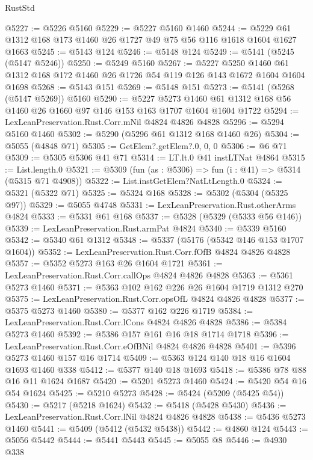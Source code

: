 \begin{lexlean}{RustStd}
\begin{coremodule}
@5227 := @5226 @5160
@5229 := @5227 @5160 @1460
@5244 := @5229 @61 @1312 @168 @173 @1460 @26 @1727 @49 @75 @56 @116 @1618 @1604 @1627 @1663
@5245 := @5143 @124
@5246 := @5148 @124
@5249 := @5141 (@5245 (@5147 @5246))
@5250 := @5249 @5160
@5267 := @5227
    @5250
    @1460
    @61
    @1312
    @168
    @172
    @1460
    @26
    @1726
    @54
    @119
    @126
    @143
    @1672
    @1604
    @1604
    @1698
@5268 := @5143 @151
@5269 := @5148 @151
@5273 := @5141 (@5268 (@5147 @5269)) @5160
@5290 := @5227
    @5273
    @1460
    @61
    @1312
    @168
    @56
    @1460
    @26
    @1660
    @97
    @146
    @153
    @163
    @1707
    @1604
    @1604
    @1722
@5294 := LexLeanPreservation.Rust.Corr.mNil @4824 @4826 @4828
@5296 := @5294 @5160 @1460
@5302 := @5290 (@5296 @61 @1312 @168 @1460 @26)
@5304 := @5055 (@4848 @71)
@5305 := GetElem?.getElem?.{0, 0, 0}
@5306 := @6 @71
@5309 := @5305 @5306 @41 @71
@5314 := LT.lt.{0} @41 instLTNat @4864
@5315 := List.length.{0}
@5321 := @5309 (fun (as : @5306) => fun (i : @41) => @5314 (@5315 @71 @4908))
@5322 := List.instGetElem?NatLtLength.{0}
@5324 := @5321 (@5322 @71)
@5325 := @5324 @168
@5328 := @5302 (@5304 (@5325 @97))
@5329 := @5055 @4748
@5331 := LexLeanPreservation.Rust.otherArms @4824
@5333 := @5331 @61 @168
@5337 := @5328 (@5329 (@5333 @56 @146))
@5339 := LexLeanPreservation.Rust.armPat @4824
@5340 := @5339 @5160
@5342 := @5340 @61 @1312
@5348 := @5337 (@5176 (@5342 @146 @153 @1707 @1604))
@5352 := LexLeanPreservation.Rust.Corr.fOfB @4824 @4826 @4828
@5357 := @5352 @5273 @163 @26 @1604 @1721
@5361 := LexLeanPreservation.Rust.Corr.callOps @4824 @4826 @4828
@5363 := @5361 @5273 @1460
@5371 := @5363 @102 @162 @226 @26 @1604 @1719 @1312 @270
@5375 := LexLeanPreservation.Rust.Corr.opsOfL @4824 @4826 @4828
@5377 := @5375 @5273 @1460
@5380 := @5377 @162 @226 @1719
@5384 := LexLeanPreservation.Rust.Corr.lCons @4824 @4826 @4828
@5386 := @5384 @5273 @1460
@5392 := @5386 @157 @161 @16 @18 @1714 @1718
@5396 := LexLeanPreservation.Rust.Corr.eOfBNil @4824 @4826 @4828
@5401 := @5396 @5273 @1460 @157 @16 @1714
@5409 := @5363 @124 @140 @18 @16 @1604 @1693 @1460 @338
@5412 := @5377 @140 @18 @1693
@5418 := @5386 @78 @88 @16 @11 @1624 @1687
@5420 := @5201 @5273 @1460
@5424 := @5420 @54 @16 @54 @1624
@5425 := @5210 @5273
@5428 := @5424 (@5209 (@5425 @54))
@5430 := @5217 (@5218 @1624)
@5432 := @5418 (@5428 @5430)
@5436 := LexLeanPreservation.Rust.Corr.lNil @4824 @4826 @4828
@5438 := @5436 @5273 @1460
@5441 := @5409 (@5412 (@5432 @5438))
@5442 := @4860 @124
@5443 := @5056 @5442
@5444 := @5441 @5443
@5445 := @5055 @8
@5446 := @4930 @338

\end{coremodule}
\end{lexlean}
